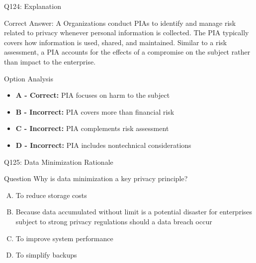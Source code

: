 \documentclass{beamer}
\begin{document}
	\begin{frame}{Q124: Explanation}
		\begin{block}{Correct Answer: A}
			Organizations conduct PIAs to identify and manage risk related to privacy whenever personal information is collected. The PIA typically covers how information is used, shared, and maintained. Similar to a risk assessment, a PIA accounts for the effects of a compromise on the subject rather than impact to the enterprise.
		\end{block}
		\begin{block}{Option Analysis}
			\begin{itemize}
				\item \textbf{A - Correct:} PIA focuses on harm to the subject
				\item \textbf{B - Incorrect:} PIA covers more than financial risk
				\item \textbf{C - Incorrect:} PIA complements risk assessment
				\item \textbf{D - Incorrect:} PIA includes nontechnical considerations
			\end{itemize}
		\end{block}
	\end{frame}
	
	\begin{frame}{Q125: Data Minimization Rationale}
		\begin{block}{Question}
			Why is data minimization a key privacy principle?
		\end{block}
		\begin{enumerate}[(A)]
			\item To reduce storage costs
			\item Because data accumulated without limit is a potential disaster for enterprises subject to strong privacy regulations should a data breach occur
			\item To improve system performance
			\item To simplify backups
		\end{enumerate}
	\end{frame}
	
\end{document}
